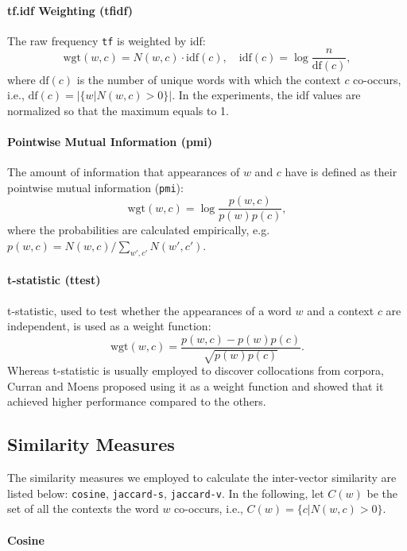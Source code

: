 \documentclass[english]{jnlp_1.4}
\begin{document}
\paragraph{tf.idf Weighting (tfidf)} \quad

The raw frequency \verb|tf| is weighted by idf:
\[
  \mbox{wgt}(w, c) = N(w, c) \cdot \mbox{idf}(c), \quad \mbox{idf}(c) = \log \frac{n}{\mbox{df}(c)},
\]
where $\mbox{df}(c)$ is the number of unique words with which the
context $c$ co-occurs, i.e., $\mbox{df}(c) = |\{ w | N(w, c) >
0\}|$. In the experiments, the idf values are normalized so that the
maximum equals to 1.

\paragraph{Pointwise Mutual Information (pmi)} \quad

The amount of information that appearances of $w$ and $c$ have is
defined as their pointwise mutual information (\verb|pmi|):
\[
  \mbox{wgt}(w, c) = \log \frac{p(w,c)}{p(w)p(c)},
\]
where the probabilities are calculated empirically, e.g. $p(w, c) =
N(w, c) / \sum_{w', c'} N(w', c')$.

\paragraph{t-statistic (ttest)} \quad

t-statistic, used to test whether the appearances of a word $w$ and
a context $c$ are independent, is used as a weight function:
\[
  \mbox{wgt}(w,c) = \frac{p(w, c) - p(w)p(c)}{\sqrt{p(w)p(c)}}.
\]
Whereas t-statistic is usually employed to discover collocations from
corpora, Curran and Moens \cite{Curran:02:improvements} proposed using
it as a weight function and showed that it achieved higher performance
compared to the others.


\subsection{Similarity Measures}

The similarity measures we employed to calculate the inter-vector
similarity are listed below: \verb|cosine|, \verb|jaccard-s|,
\verb|jaccard-v|. In the following, let $C(w)$ be the set of all the
contexts the word $w$ co-occurs, i.e., $C(w) = \{c | N(w, c) > 0\}$.

\paragraph{Cosine} \quad
\end{document}
